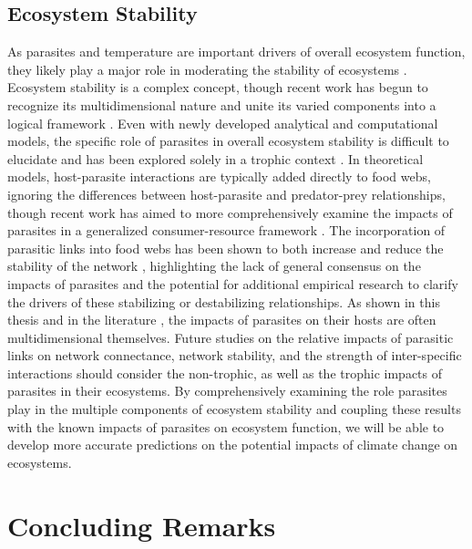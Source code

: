 \subsection{Ecosystem Stability}

As parasites and temperature are important drivers of overall ecosystem function, they likely play a major role in moderating the stability of ecosystems \citep{lafferty2008, jephcott2016}. Ecosystem stability is a complex concept, though recent work has begun to recognize its multidimensional nature and unite its varied components into a logical framework \citep{pimm1984, donohue2013, donohue2016, hillebrand2018}. Even with newly developed analytical and computational models, the specific role of parasites in overall ecosystem stability is difficult to elucidate and has been explored solely in a trophic context \citep{dunne2013}. In theoretical models, host-parasite interactions are typically added directly to food webs, ignoring the differences between host-parasite and predator-prey relationships, though recent work has aimed to more comprehensively examine the impacts of parasites in a generalized consumer-resource framework \citep{lafferty2015}. The incorporation of parasitic links into food webs has been shown to both increase and reduce the stability of the network \citep{wood2015}, highlighting the lack of general consensus on the impacts of parasites and the potential for additional empirical research to clarify the drivers of these stabilizing or destabilizing relationships. As shown in this thesis and in the literature \citep{perrot2014}, the impacts of parasites on their hosts are often multidimensional themselves. Future studies on the relative impacts of parasitic links on network connectance, network stability, and the strength of inter-specific interactions should consider the non-trophic, as well as the trophic impacts of parasites in their ecosystems. By comprehensively examining the role parasites play in the multiple components of ecosystem stability and coupling these results with the known impacts of parasites on ecosystem function, we will be able to develop more accurate predictions on the potential impacts of climate change on ecosystems.

\section{Concluding Remarks}

